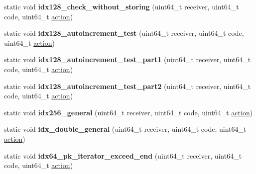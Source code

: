 \begin{DoxyCompactItemize}
\item 
\mbox{\label{structtest__multi__index_a417f392c59f45c688abd1bdcd324dc17}} 
static void {\bfseries idx128\+\_\+check\+\_\+without\+\_\+storing} (uint64\+\_\+t receiver, uint64\+\_\+t code, uint64\+\_\+t \mbox{\hyperlink{structaacio_1_1action}{action}})
\item 
\mbox{\label{structtest__multi__index_ae1371a1ebd33c97423018228bf54cb8b}} 
static void {\bfseries idx128\+\_\+autoincrement\+\_\+test} (uint64\+\_\+t receiver, uint64\+\_\+t code, uint64\+\_\+t \mbox{\hyperlink{structaacio_1_1action}{action}})
\item 
\mbox{\label{structtest__multi__index_a113168846e6dc03d8c5f58b690e24786}} 
static void {\bfseries idx128\+\_\+autoincrement\+\_\+test\+\_\+part1} (uint64\+\_\+t receiver, uint64\+\_\+t code, uint64\+\_\+t \mbox{\hyperlink{structaacio_1_1action}{action}})
\item 
\mbox{\label{structtest__multi__index_afeab71039d7ef7baec5a7c599e1a74a4}} 
static void {\bfseries idx128\+\_\+autoincrement\+\_\+test\+\_\+part2} (uint64\+\_\+t receiver, uint64\+\_\+t code, uint64\+\_\+t \mbox{\hyperlink{structaacio_1_1action}{action}})
\item 
\mbox{\label{structtest__multi__index_a392dcdf33ee223b293b3839accfe790b}} 
static void {\bfseries idx256\+\_\+general} (uint64\+\_\+t receiver, uint64\+\_\+t code, uint64\+\_\+t \mbox{\hyperlink{structaacio_1_1action}{action}})
\item 
\mbox{\label{structtest__multi__index_a75967c9bbb992286a85cf3afcaaf48a6}} 
static void {\bfseries idx\+\_\+double\+\_\+general} (uint64\+\_\+t receiver, uint64\+\_\+t code, uint64\+\_\+t \mbox{\hyperlink{structaacio_1_1action}{action}})
\item 
\mbox{\label{structtest__multi__index_a3221d139456b7efb99ee4d0d6b679ec6}} 
static void {\bfseries idx64\+\_\+pk\+\_\+iterator\+\_\+exceed\+\_\+end} (uint64\+\_\+t receiver, uint64\+\_\+t code, uint64\+\_\+t \mbox{\hyperlink{structaacio_1_1action}{action}})
\item 

\end{DoxyCompactItemize}
